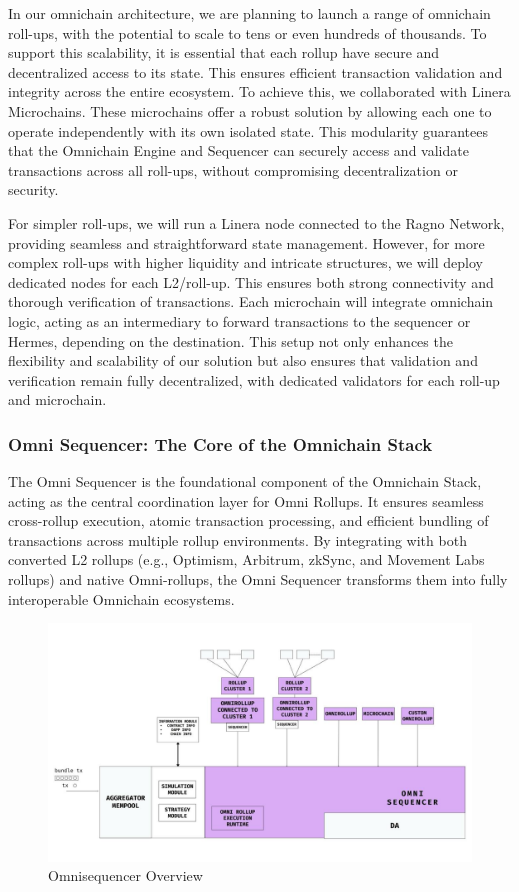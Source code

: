 In our omnichain architecture, we are planning to launch a range of omnichain roll-ups, with the potential to scale to tens or even hundreds of thousands. To support this scalability, it is essential that each rollup have secure and decentralized access to its state. This ensures efficient transaction validation and integrity across the entire ecosystem. To achieve this, we collaborated with Linera Microchains. These microchains offer a robust solution by allowing each one to operate independently with its own isolated state. This modularity guarantees that the Omnichain Engine and Sequencer can securely access and validate transactions across all roll-ups, without compromising decentralization or security.

For simpler roll-ups, we will run a Linera node connected to the Ragno Network, providing seamless and straightforward state management. However, for more complex roll-ups with higher liquidity and intricate structures, we will deploy dedicated nodes for each L2/roll-up. This ensures both strong connectivity and thorough verification of transactions. Each microchain will integrate omnichain logic, acting as an intermediary to forward transactions to the sequencer or Hermes, depending on the destination. This setup not only enhances the flexibility and scalability of our solution but also ensures that validation and verification remain fully decentralized, with dedicated validators for each roll-up and microchain.

\subsubsection{Omni Sequencer: The Core of the Omnichain Stack}

The Omni Sequencer is the foundational component of the Omnichain Stack, acting as the central coordination layer for Omni Rollups. It ensures seamless cross-rollup execution, atomic transaction processing, and efficient bundling of transactions across multiple rollup environments. By integrating with both converted L2 rollups (e.g., Optimism, Arbitrum, zkSync, and Movement Labs rollups) and native Omni-rollups, the Omni Sequencer transforms them into fully interoperable Omnichain ecosystems.

 \begin{figure}[h!]
    \centering
    \includegraphics[width=0.99\linewidth]{figure/omnisequencer.jpg}
    \caption{Omnisequencer Overview}
    \label{fig:separate_rollup}
\end{figure}


